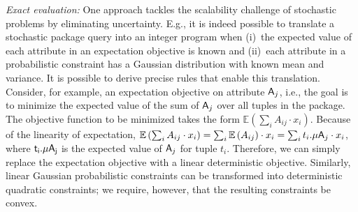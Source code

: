 \documentclass[11pt]{article}
\newcommand{\attr}[1]{{\sf #1}}
\newcommand{\expe}[1]{\mathbb{E}\left(#1\right)}
\newcommand{\ssf}[1]{{${\sf #1}$}}
\begin{document}
\smallskip\textit{Exact evaluation:} One approach tackles the scalability challenge of stochastic problems by eliminating uncertainty. E.g., it is indeed possible to translate a stochastic package query into an integer program when (i)~the expected value of each attribute in an expectation objective is known and (ii)~each attribute in a probabilistic constraint has a Gaussian distribution with known mean and variance. It is possible to derive precise rules that enable this translation. Consider, for example, an expectation objective on attribute $\attr{A}_j$, i.e., the goal is to minimize the expected value of the sum of $\attr{A}_j$ over all tuples in the package. The objective function to be minimized takes the form $\expe{\sum_i A_{ij}\cdot  x_i}$. Because of the linearity of expectation, $\expe{\sum_i A_{ij}\cdot x_i} = \sum_i \expe{A_{ij}}\cdot x_i = \sum_i t_i.{\mu\attr{A}_j} \cdot x_i$, where \ssf{t_i.\mu\attr{A}_j} is the expected value of $\attr{A}_j$ for tuple $t_i$. Therefore, we can simply replace the expectation objective with a linear deterministic objective. Similarly, linear Gaussian probabilistic constraints can be transformed into deterministic quadratic constraints; we require, however, that the resulting constraints be convex.
\end{document}
